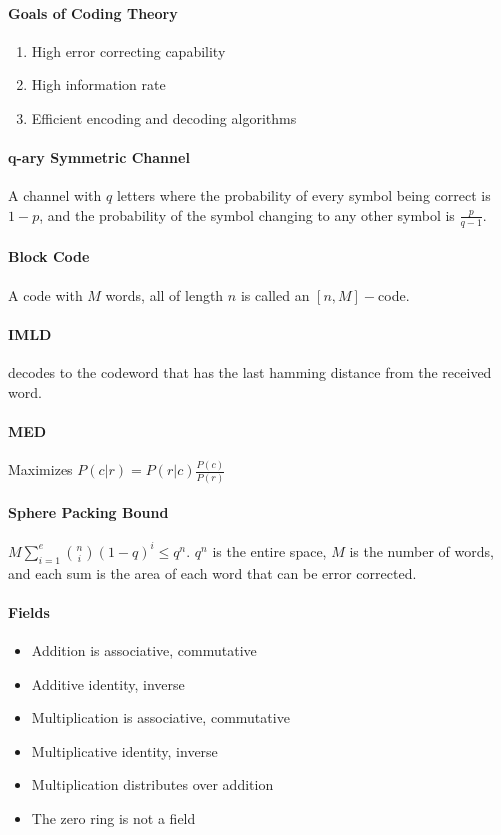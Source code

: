 \documentclass[10pt,letter]{article}
\theoremstyle{plain}
\theoremstyle{definition}
\begin{document}
\paragraph{Goals of Coding Theory}
\begin{enumerate}
    \item High error correcting capability
    \item High information rate 
    \item Efficient encoding and decoding algorithms
\end{enumerate}
\paragraph{q-ary Symmetric Channel} A channel with $q$ letters where the probability of every symbol being correct is $1-p$, and the probability of the symbol changing to any other symbol is $\frac{p}{q-1}$. 
\paragraph{Block Code} A code with $M$ words, all of length $n$ is called an $[n,M]-$code. 
\paragraph{IMLD} decodes to the codeword that has the last hamming distance from the received word.
\paragraph{MED} Maximizes $P(c|r)=P(r|c)\frac{P(c)}{P(r)}$
\paragraph{Sphere Packing Bound}$M\sum_{i=1}^e{n\choose i}(1-q)^i\leq q^n$. $q^n$ is the entire space, $M$ is the number of words, and each sum is the area of each word that can be error corrected. 
\paragraph{Fields}
\begin{itemize}
    \item Addition is associative, commutative
    \item Additive identity, inverse
    \item Multiplication is associative, commutative
    \item Multiplicative identity, inverse
    \item Multiplication distributes over addition
    \item The zero ring is not a field
\end{itemize}
\end{document}
